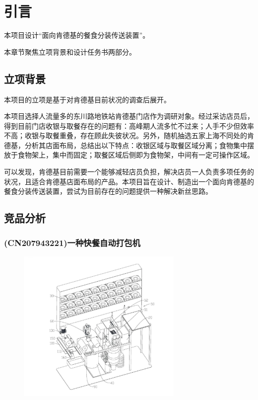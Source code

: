 
\chapter{引言}
本项目设计“面向肯德基的餐食分装传送装置”。

本章节聚焦立项背景和设计任务书两部分。

\section{立项背景}
本项目的立项是基于对肯德基目前状况的调查后展开。

本项目选择人流量多的东川路地铁站肯德基门店作为调研对象。经过采访店员后，得到目前门店收银与取餐存在的问题有：高峰期人流多忙不过来；人手不少但效率不高；收银与取餐重叠，存在顾此失彼状况。另外，随机抽选五家上海不同处的肯德基，分析其店面布局，总结出以下特点：收银区域与取餐区域分离；食物集中摆放于食物架上，集中而固定；取餐区域后侧即为食物架，中间有一定可操作区域。

可以发现，肯德基目前需要一个能够减轻店员负担，解决店员一人负责多项任务的状况，且适合肯德基店面布局的产品。本项目旨在设计、制造出一个面向肯德基的餐食分装传送装置，尝试为目前存在的问题提供一种解决新丝思路。

\section{竞品分析}

\subsection{(CN207943221)一种快餐自动打包机}

\begin{figure}[h]
  \centering
  \includegraphics[width=8cm]{figure/intro2.jpg}
\end{figure}

